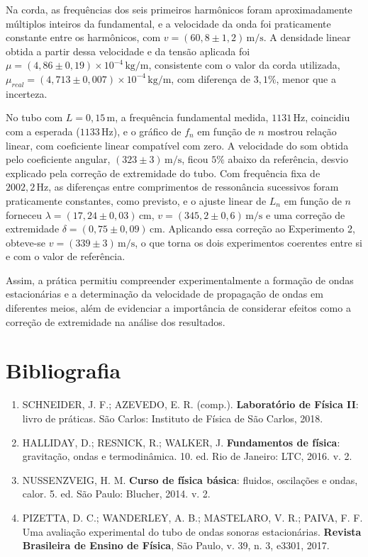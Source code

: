 \documentclass[12pt, a4paper]{article}
\newcommand{\un}[1]{\,\mathrm{#1}}
\begin{document}
Na corda, as frequências dos seis primeiros harmônicos foram aproximadamente múltiplos inteiros da fundamental, e a velocidade da onda foi praticamente constante entre os harmônicos, com $v=(60{,}8\pm1{,}2)\un{m/s}$. A densidade linear obtida a partir dessa velocidade e da tensão aplicada foi $\mu=(4{,}86\pm0{,}19)\times10^{-4}\un{kg/m}$, consistente com o valor da corda utilizada, $\mu_{real}=(4{,}713\pm0{,}007)\times10^{-4}\un{kg/m}$, com diferença de $3{,}1\%$, menor que a incerteza.

No tubo com $L=0{,}15\un{m}$, a frequência fundamental medida, $1131\un{Hz}$, coincidiu com a esperada ($1133\un{Hz}$), e o gráfico de $f_n$ em função de $n$ mostrou relação linear, com coeficiente linear compatível com zero. A velocidade do som obtida pelo coeficiente angular, $(323\pm3)\un{m/s}$, ficou $5\%$ abaixo da referência, desvio explicado pela correção de extremidade do tubo. Com frequência fixa de $2002{,}2\un{Hz}$, as diferenças entre comprimentos de ressonância sucessivos foram praticamente constantes, como previsto, e o ajuste linear de $L_n$ em função de $n$ forneceu $\lambda=(17{,}24\pm0{,}03)\un{cm}$, $v=(345{,}2\pm0{,}6)\un{m/s}$ e uma correção de extremidade $\delta=(0{,}75\pm0{,}09)\un{cm}$. Aplicando essa correção ao Experimento 2, obteve-se $v=(339\pm3)\un{m/s}$, o que torna os dois experimentos coerentes entre si e com o valor de referência.

Assim, a prática permitiu compreender experimentalmente a formação de ondas estacionárias e a determinação da velocidade de propagação de ondas em diferentes meios, além de evidenciar a importância de considerar efeitos como a correção de extremidade na análise dos resultados.

\section{Bibliografia}

\begin{enumerate}
    \item SCHNEIDER, J. F.; AZEVEDO, E. R. (comp.). \textbf{Laboratório de Física II}: livro de práticas. São Carlos: Instituto de Física de São Carlos, 2018.
    \item HALLIDAY, D.; RESNICK, R.; WALKER, J. \textbf{Fundamentos de física}: gravitação, ondas e termodinâmica. 10. ed. Rio de Janeiro: LTC, 2016. v. 2.
    \item NUSSENZVEIG, H. M. \textbf{Curso de física básica}: fluidos, oscilações e ondas, calor. 5. ed. São Paulo: Blucher, 2014. v. 2.
    \item PIZETTA, D. C.; WANDERLEY, A. B.; MASTELARO, V. R.; PAIVA, F. F. Uma avaliação experimental do tubo de ondas sonoras estacionárias. \textbf{Revista Brasileira de Ensino de Física}, São Paulo, v. 39, n. 3, e3301, 2017.
\end{enumerate}
\end{document}
